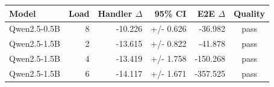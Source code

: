 \begin{tabular}{lrrrrc}
\toprule
Model & Load & Handler $\Delta$ & 95\% CI & E2E $\Delta$ & Quality \\
\midrule
Qwen2.5-0.5B & 8 & -10.226 & +/- 0.626 & -36.982 & pass \\
Qwen2.5-1.5B & 2 & -13.615 & +/- 0.822 & -41.878 & pass \\
Qwen2.5-1.5B & 4 & -13.419 & +/- 1.758 & -150.268 & pass \\
Qwen2.5-1.5B & 6 & -14.117 & +/- 1.671 & -357.525 & pass \\
\bottomrule
\end{tabular}
